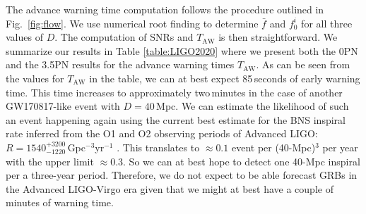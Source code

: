 \documentclass[prd,amsmath,amssymb,aps,floats,amsfonts,notitlepage,superscriptaddress,eqsecnum,nofootinbib,10pt]{revtex4-1}
\begin{document}
The advance warning time computation follows the procedure outlined in Fig.~\ref{fig:flow}. We use numerical root finding to determine $\bar{f}$ and $f_0^i$ for all three values of $D$. 
The computation of SNRs and $T_\text{AW}$ is then straightforward. 
We summarize our results in Table \ref{table:LIGO2020} where we present both the 0PN and the 3.5PN results for the advance warning times
$T_\text{AW}$. As can be seen from the values for $T_\text{AW}$ in the table, we can at best expect 85\,seconds of early warning time.
This time increases to approximately two\,minutes in the case of another GW170817-like event with $D=40\,$Mpc.
We can estimate the likelihood of such an event happening again
using the current best estimate for the BNS inspiral rate 
inferred from the O1 and O2 observing periods of Advanced LIGO: $ R=1540^{+3200}_{-1220}\,$Gpc$^{-3}$yr$^{-1}$ \cite{GW170817}.
This translates to $\approx 0.1$ event per (40-Mpc)$^3$ per year with the upper limit $\approx 0.3$. So we can at best hope to detect
one 40-Mpc inspiral per a three-year period.
Therefore, we do not expect to be able forecast GRBs in the Advanced LIGO-Virgo era given that we might at best have a couple of minutes of warning time. 
%
%
\end{document}
